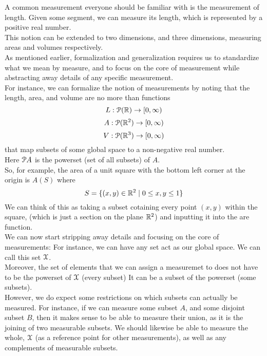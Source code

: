 \documentclass[12pt]{article}
\begin{document}
    A common measurement everyone should be
    familiar with is the measurement of length.
    Given some segment, 
    we can measure its length,
    which is represented by a positive real number. \\
    This notion can be extended to two dimensions,
    and three dimensions,
    measuring areas and volumes respectively. \\
    
    As mentioned earlier,
    formalization and generalization
    requires us to standardize what we mean by measure,
    and to focus on the core of measurement
    while abstracting away details of any specific
    measurement. \\

    For instance,
    we can formalize the notion of measurements
    by noting that the length,
    area, and volume are no more than functions
    \[ L:\mathcal{P}(\mathbb{R}) \to [0, \infty) \]    
    \[ A:\mathcal{P}(\mathbb{R}^2) \to [0, \infty) \]
    \[ V:\mathcal{P}(\mathbb{R}^3) \to [0, \infty) \]
    that map subsets of some global space
    to a non-negative real number. \\
    Here $\mathcal{P}{A}$ is the powerset 
    (set of all subsets) of $A$. \\
    So, for example,
    the area of a unit square
    with the bottom left corner at the origin
    is $A(S)$ where 
    \[ S = \{ (x, y) \in \mathbb{R}^2 \mid 
    0 \leq x, y \leq 1  \} \]
    We can think of this as taking a subset cotaining
    every point $(x, y)$ within the square,
    (which is just a section on the plane $\mathbb{R}^2$)
    and inputting it into the are function. \\

    We can now start stripping away details
    and focusing on the core of measurements:
    For instance, we can have any set act
    as our global space.
    We can call this set $\mathcal{X}$. \\
    Moreover, the set of elements that we can
    assign a measuremet to does not have to be
    the powerset of $\mathcal{X}$ (every subset)
    It can be a subset of the powerset
    (some subsets). \\

    However, we do expect some restrictions
    on which subsets can actually be measured.
    For instance, if we can measure some
    subset $A$, and some disjoint subset $B$,
    then it makes sense to be able to measure
    their union, as it is the joining of two
    measurable subsets.
    We should likewise be able to measure the whole,
    $\mathcal{X}$ (as a reference point for
    other measurements),
    as well as any complements of measurable subsets. \\
\end{document}
